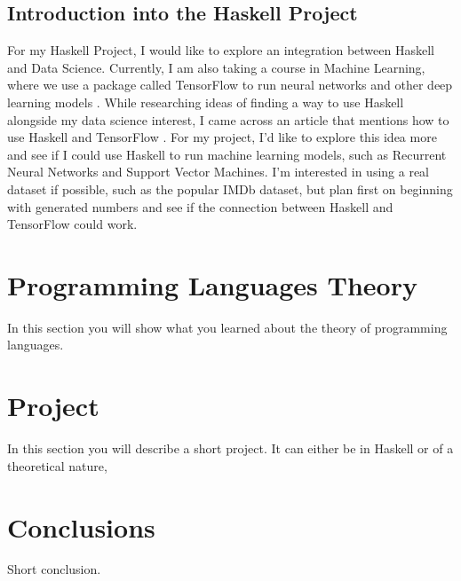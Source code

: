 \documentclass{article}
\begin{document}
\subsection{Introduction into the Haskell Project}

For my Haskell Project, I would like to explore an integration between Haskell and Data Science. Currently, I am also taking a course in Machine Learning, where we use a package called TensorFlow to run neural networks and other deep learning models \cite{TF}. While researching ideas of finding a way to use Haskell alongside my data science interest, I came across an article that mentions how to use Haskell and TensorFlow \cite{HTF}. For my project, I'd like to explore this idea more and see if I could use Haskell to run machine learning models, such as Recurrent Neural Networks and Support Vector Machines. I'm interested in using a real dataset if possible, such as the popular IMDb dataset, but plan first on beginning with generated numbers and see if the connection between Haskell and TensorFlow could work.

\section{Programming Languages Theory}

In this section you will show what you learned about the theory of programming languages. 

\section{Project}

In this section you will describe a short project. It can either be in Haskell or of a theoretical nature,

\section{Conclusions}\label{conclusions}
Short conclusion. 
\end{document}

